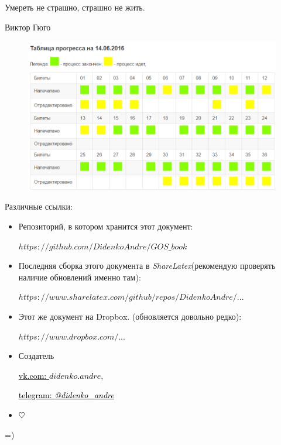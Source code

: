 \epigraph{Умереть не страшно, страшно не жить.}{Виктор Гюго}

\begin{figure}[h!]
\includegraphics[width=\textwidth]{pictures/progress}
\end{figure}

\mbox{}

Различные ссылки:
\begin{itemize}
\item

Репозиторий, в котором хранится этот документ:

\href{https://github.com/DidenkoAndre/GOS_book}{$https://github.com/DidenkoAndre/GOS\_book$}

\item
Последняя сборка этого документа в \textit{ShareLatex}\newline (рекомендую проверять наличие обновлений именно там): 

\href{https://www.sharelatex.com/github/repos/DidenkoAndre/GOS_book/builds/latest/output.pdf}{$https://www.sharelatex.com/github/repos/DidenkoAndre/...$}

\item

Этот же документ на Dropbox.  \newline (обновляется довольно редко):

\href{https://www.dropbox.com/sh/7e5mfj8q68o2ipp/AAD8XvpZhiJzFbEh_IeH305ia?dl=0&preview=GOSMat.pdf}{$https://www.dropbox.com/...$}

\item
Создатель

\href{https://vk.com/didenko.andre}{\textcolor{black}{vk.com: \textcolor{Purplemountainmajesty}{$didenko.andre$}}},

\href{https://telegram.me/didenko_andre}{\textcolor{black}{telegram: \textcolor{Purplemountainmajesty}{\textit{@didenko_andre}}}}

\item

$\heartsuit$
\end{itemize}
=)